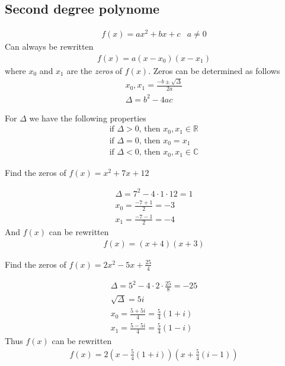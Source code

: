 \subsection{Second degree polynome}
\begin{eqnarray}
	f(x)=ax^2+bx+c&a\neq0
\end{eqnarray}
Can always be rewritten
\begin{eqnarray}
	f(x)=a(x-x_0)(x-x_1)
\end{eqnarray}
where $x_0$ and $x_1$ are the \emph{zeros} of $f(x)$.
Zeros can be determined as follows
\begin{eqnarray}
	x_0,x_1=\frac{-b\pm\sqrt{\Delta}}{2a}\\
	\Delta=b^2-4ac
\end{eqnarray}

For $\Delta$ we have the following properties
\begin{eqnarray}
	\text{if }\Delta>0\text{, then }x_0,x_1\in\mathbb R\\
	\text{if }\Delta=0\text{, then }x_0=x_1\\
	\text{if }\Delta<0\text{, then }x_0,x_1\in\mathbb C
\end{eqnarray}
\begin{myExample}
	Find the zeros of $f(x)=x^2+7x+12$
	
	\begin{eqnarray*}
		\Delta = 7^2-4\cdot1\cdot12=1\\
		x_0=\frac{-7+1}{2}=-3\\
		x_1=\frac{-7-1}{2}=-4
	\end{eqnarray*}
	And $f(x)$ can be rewritten
	\begin{eqnarray*}
		f(x)=(x+4)(x+3)
	\end{eqnarray*}
\end{myExample}

\begin{myExample}
	Find the zeros of $f(x)=2x^2-5x+\frac{25}{4}$
	
	\begin{eqnarray*}
		\Delta = 5^2-4\cdot2\cdot\frac{25}{8}=-25\\
		\sqrt{\Delta}=5i\\
		x_0=\frac{5+5i}{4}=\frac{5}{4}(1+i)\\
		x_1=\frac{5-5i}{4}=\frac{5}{4}(1-i)
	\end{eqnarray*}
	Thus $f(x)$ can be rewritten
	\begin{eqnarray*}
		f(x)=2\left(x-\frac{5}{4}(1+i)\right)\left(x+\frac{5}{4}(i-1)\right)
	\end{eqnarray*}
\end{myExample}


